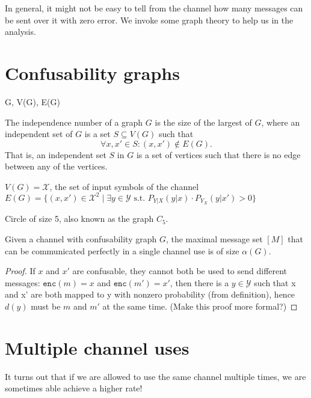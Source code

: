 In general, it might not be easy to tell from the channel how many messages can be sent over it with zero error. We invoke some graph theory to help us in the analysis.

\section{Confusability graphs}

\begin{definition}[Graph]
G, V(G), E(G)
\end{definition}

\begin{definition}
The independence number of a graph $G$ is the size of the largest  of $G$, where an independent set of $G$ is a set $S \subseteq V(G)$ such that
\[
\forall x, x' \in S: (x,x') \not\in E(G).
\]
That is, an independent set $S$ in $G$ is a set of vertices such that there is no edge between any of the vertices.
\end{definition}

\begin{definition}
$V(G) = \mathcal{X}$, the set of input symbols of the channel
$E(G) = \{(x,x') \in \mathcal{X}^2 \mid \exists y \in \mathcal{Y} \mbox{ s.t. } P_{Y|X}(y|x) \cdot P_{Y_X}(y|x') > 0\}$
\end{definition}

\begin{example}
Circle of size 5, also known as the graph $C_5$.
\end{example}




\begin{proposition}
Given a channel with confusability graph $G$, the maximal message set $[M]$ that can be communicated perfectly in a single channel use is of size $\alpha(G)$.
\end{proposition}

\begin{proof}
If $x$ and $x'$ are confusable, they cannot both be used to send different messages:
$\mathtt{enc}(m) = x$ and $\mathtt{enc}(m') = x'$, then there is a $y \in \mathcal{Y}$ such that x and x' are both mapped to y with nonzero probability (from definition), hence $d(y)$ must be $m$ and $m'$ at the same time.
(Make this proof more formal?)
\end{proof}


\section{Multiple channel uses}
It turns out that if we are allowed to use the same channel multiple times, we are sometimes able achieve a higher rate!

